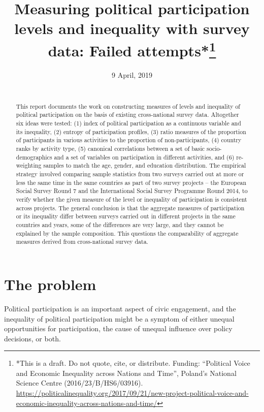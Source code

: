 \documentclass[12pt,]{article}
\title{\vspace{1cm}Measuring political participation levels and inequality with survey data: Failed attempts*\footnote{*This is a draft. Do not quote, cite, or distribute. Funding: ``Political Voice and Economic Inequality across Nations and Time'', Poland's National Science Centre (2016/23/B/HS6/03916). \url{https://politicalinequality.org/2017/09/21/new-project-political-voice-and-economic-inequality-across-nations-and-time/}}\vspace{0.5cm}\\}
\author{}
\date{9 April, 2019\\
~\\}
\begin{document}
\maketitle
\begin{abstract}
\noindent{}This report documents the work on constructing measures of levels and inequality of political participation on the basis of existing cross-national survey data. Altogether six ideas were tested: (1) index of political participation as a continuous variable and its inequality, (2) entropy of participation profiles, (3) ratio measures of the proportion of participants in various activities to the proportion of non-participants, (4) country ranks by activity type, (5) canonical correlations between a set of basic socio-demographics and a set of variables on participation in different activities, and (6) re-weighting samples to match the age, gender, and education distribution. The empirical strategy involved comparing sample statistics from two surveys carried out at more or less the same time in the same countries as part of two survey projects -- the European Social Survey Round 7 and the International Social Survey Programme Round 2014, to verify whether the given measure of the level or inequality of participation is consistent across projects. The general conclusion is that the aggregate measures of participation or its inequality differ between surveys carried out in different projects in the same countries and years, some of the differences are very large, and they cannot be explained by the sample composition. This questions the comparability of aggregate measures derived from cross-national survey data. \vspace{.8cm}
\end{abstract}

\clearpage

\renewcommand{\baselinestretch}{0.5}\normalsize
\tableofcontents
\renewcommand{\baselinestretch}{1.1}\normalsize

\clearpage

\hypertarget{the-problem}{%
\section{The problem}\label{the-problem}}

Political participation is an important aspect of civic engagement, and the inequality of political participation might be a symptom of either unequal opportunities for participation, the cause of unequal influence over policy decisions, or both.
\end{document}
